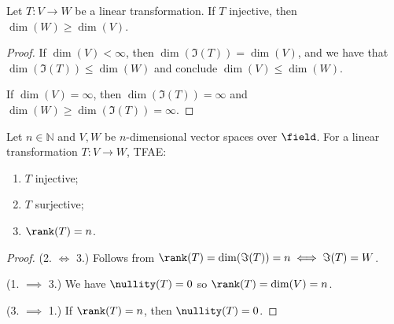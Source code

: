 \begin{corollary}
    Let $T: V \to W$ be a linear transformation. If $T$ injective, then $\dim (W) \geq \dim (V)$.
\end{corollary}

\begin{proof}
    If $\dim(V) < \infty$, then $\dim (\Im(T))=\dim (V)$, and we have that $\dim(\Im(T)) \leq \dim (W)$ and conclude $\dim(V) \leq \dim (W)$.

    If $\dim(V) = \infty$, then $\dim(\Im(T)) = \infty$ and $\dim(W) \geq \dim(\Im(T)) = \infty$.
\end{proof}

\begin{corollary}
    Let $n \in \mathbb{N}$ and $V, W$ be $n$-dimensional vector spaces over $\field$. For a linear transformation $T : V \to W$, TFAE:
    \begin{enumerate}
        \item $T$ injective;
        \item $T$ surjective;
        \item $\rank(T) = n$.
    \end{enumerate}
\end{corollary}

\begin{proof}
    (2. $\iff$ 3.) Follows from $\rank(T) = \dim(\Im(T)) = n \iff \Im(T) = W$.

    \noindent (1. $\implies$ 3.) We have $\nullity(T) = 0$ so $\rank(T) = \dim(V) = n$.

    \noindent (3. $\implies$ 1.) If $\rank(T) = n$, then $\nullity(T) = 0$.
\end{proof}